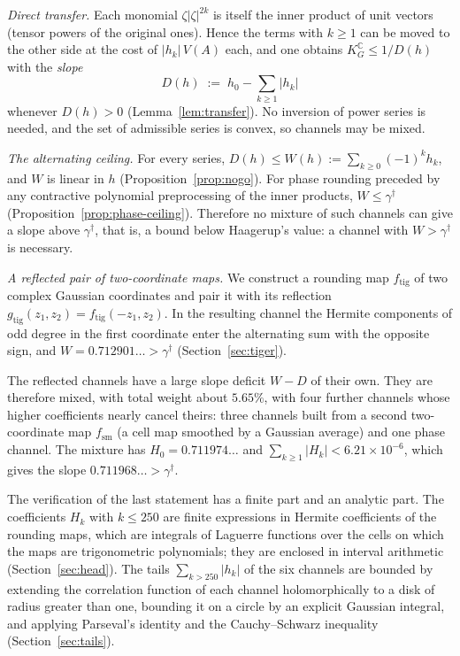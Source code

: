 \documentclass[11pt,reqno]{amsart}
\theoremstyle{definition}
\numberwithin{equation}{section}
\newcommand{\C}{\mathbb{C}}
\newcommand{\KGC}{K_G^{\C}}
\newcommand{\gd}{\gamma^\dagger}
\newcommand{\ftig}{f_{\mathrm{tig}}}
\newcommand{\gtig}{g_{\mathrm{tig}}}
\newcommand{\fsm}{f_{\mathrm{sm}}}
\begin{document}
\emph{Direct transfer.} Each monomial $\zeta|\zeta|^{2k}$ is itself the inner product of unit vectors (tensor powers of the original ones). Hence the terms with $k\ge1$ can be moved to the other side at the cost of $|h_k|\,V(A)$ each, and one obtains $\KGC\le 1/D(h)$ with the \emph{slope}
\[
  D(h) \;:=\; h_0-\sum_{k\ge1}|h_k|
\]
whenever $D(h)>0$ (Lemma~\ref{lem:transfer}). No inversion of power series is needed, and the set of admissible series is convex, so channels may be mixed.

\emph{The alternating ceiling.} For every series, $D(h)\le W(h):=\sum_{k\ge0}(-1)^kh_k$, and $W$ is linear in $h$ (Proposition~\ref{prop:nogo}). For phase rounding preceded by any contractive polynomial preprocessing of the inner products, $W\le\gd$ (Proposition~\ref{prop:phase-ceiling}). Therefore no mixture of such channels can give a slope above $\gd$, that is, a bound below Haagerup's value: a channel with $W>\gd$ is necessary.

\emph{A reflected pair of two-coordinate maps.} We construct a rounding map $\ftig$ of two complex Gaussian coordinates and pair it with its reflection $\gtig(z_1,z_2)=\ftig(-z_1,z_2)$. In the resulting channel the Hermite components of odd degree in the first coordinate enter the alternating sum with the opposite sign, and $W=0.712901\ldots>\gd$ (Section~\ref{sec:tiger}).

The reflected channels have a large slope deficit $W-D$ of their own. They are therefore mixed, with total weight about $5.65\%$, with four further channels whose higher coefficients nearly cancel theirs: three channels built from a second two-coordinate map $\fsm$ (a cell map smoothed by a Gaussian average) and one phase channel. The mixture has $H_0=0.711974\ldots$ and $\sum_{k\ge1}|H_k|<6.21\times10^{-6}$, which gives the slope $0.711968\ldots>\gd$.

The verification of the last statement has a finite part and an analytic part. The coefficients $H_k$ with $k\le250$ are finite expressions in Hermite coefficients of the rounding maps, which are integrals of Laguerre functions over the cells on which the maps are trigonometric polynomials; they are enclosed in interval arithmetic (Section~\ref{sec:head}). The tails $\sum_{k>250}|h_k|$ of the six channels are bounded by extending the correlation function of each channel holomorphically to a disk of radius greater than one, bounding it on a circle by an explicit Gaussian integral, and applying Parseval's identity and the Cauchy--Schwarz inequality (Section~\ref{sec:tails}).
\end{document}
